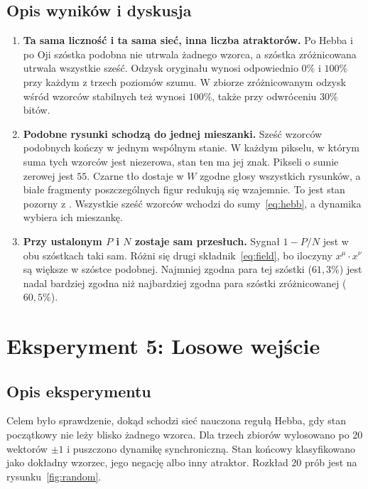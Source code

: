 \documentclass[11pt,a4paper]{article}
\begin{document}
\subsection{Opis wyników i dyskusja}
\begin{enumerate}
    \item \textbf{Ta sama liczność i ta sama sieć, inna liczba atraktorów.}
    Po Hebba i po Oji szóstka podobna nie utrwala żadnego wzorca, a szóstka zróżnicowana utrwala wszystkie sześć. Odzysk oryginału wynosi odpowiednio \(0\%\) i \(100\%\) przy każdym z trzech poziomów szumu. W zbiorze zróżnicowanym odzysk wśród wzorców stabilnych też wynosi \(100\%\), także przy odwróceniu \(30\%\) bitów.

    \item \textbf{Podobne rysunki schodzą do jednej mieszanki.}
    Sześć wzorców podobnych kończy w jednym wspólnym stanie. W każdym pikselu, w którym suma tych wzorców jest niezerowa, stan ten ma jej znak. Pikseli o sumie zerowej jest \(55\). Czarne tło dostaje w \(W\) zgodne głosy wszystkich rysunków, a białe fragmenty poszczególnych figur redukują się wzajemnie. To jest stan pozorny z \cite{amit1985}. Wszystkie sześć wzorców wchodzi do sumy~\eqref{eq:hebb}, a dynamika wybiera ich mieszankę.

    \item \textbf{Przy ustalonym \(P\) i \(N\) zostaje sam przesłuch.}
    Sygnał \(1 - P/N\) jest w obu szóstkach taki sam. Różni się drugi składnik~\eqref{eq:field}, bo iloczyny \(x^{\mu}\cdot x^{\nu}\) są większe w szóstce podobnej. Najmniej zgodna para tej szóstki (\(61{,}3\%\)) jest nadal bardziej zgodna niż najbardziej zgodna para szóstki zróżnicowanej (\(60{,}5\%\)).
\end{enumerate}

\section{Eksperyment 5: Losowe wejście}
\label{sec:exp_random}

\subsection{Opis eksperymentu}
Celem było sprawdzenie, dokąd schodzi sieć nauczona regułą Hebba, gdy stan początkowy nie leży blisko żadnego wzorca. Dla trzech zbiorów wylosowano po 20 wektorów \(\pm 1\) i puszczono dynamikę synchroniczną. Stan końcowy klasyfikowano jako dokładny wzorzec, jego negację albo inny atraktor. Rozkład 20 prób jest na rysunku~\ref{fig:random}.
\end{document}
